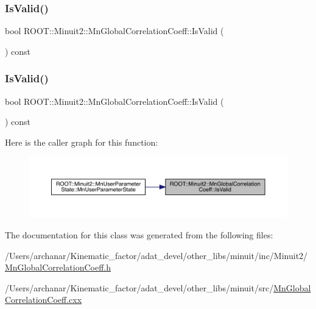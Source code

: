 \subsubsection{\texorpdfstring{IsValid()}{IsValid()}\hspace{0.1cm}{\footnotesize\ttfamily [1/2]}}
{\footnotesize\ttfamily bool R\+O\+O\+T\+::\+Minuit2\+::\+Mn\+Global\+Correlation\+Coeff\+::\+Is\+Valid (\begin{DoxyParamCaption}{ }\end{DoxyParamCaption}) const\hspace{0.3cm}{\ttfamily [inline]}}

\mbox{\label{classROOT_1_1Minuit2_1_1MnGlobalCorrelationCoeff_a1fe4d8b557ebda40e092ed3b7032fc44}} 
\subsubsection{\texorpdfstring{IsValid()}{IsValid()}\hspace{0.1cm}{\footnotesize\ttfamily [2/2]}}
{\footnotesize\ttfamily bool R\+O\+O\+T\+::\+Minuit2\+::\+Mn\+Global\+Correlation\+Coeff\+::\+Is\+Valid (\begin{DoxyParamCaption}{ }\end{DoxyParamCaption}) const\hspace{0.3cm}{\ttfamily [inline]}}

Here is the caller graph for this function\+:\nopagebreak
\begin{figure}[H]
\begin{center}
\leavevmode
\includegraphics[width=350pt]{da/d0d/classROOT_1_1Minuit2_1_1MnGlobalCorrelationCoeff_a1fe4d8b557ebda40e092ed3b7032fc44_icgraph}
\end{center}
\end{figure}


The documentation for this class was generated from the following files\+:\begin{DoxyCompactItemize}
\item 
/\+Users/archanar/\+Kinematic\+\_\+factor/adat\+\_\+devel/other\+\_\+libs/minuit/inc/\+Minuit2/\mbox{\hyperlink{other__libs_2minuit_2inc_2Minuit2_2MnGlobalCorrelationCoeff_8h}{Mn\+Global\+Correlation\+Coeff.\+h}}\item 
/\+Users/archanar/\+Kinematic\+\_\+factor/adat\+\_\+devel/other\+\_\+libs/minuit/src/\mbox{\hyperlink{MnGlobalCorrelationCoeff_8cxx}{Mn\+Global\+Correlation\+Coeff.\+cxx}}\end{DoxyCompactItemize}
